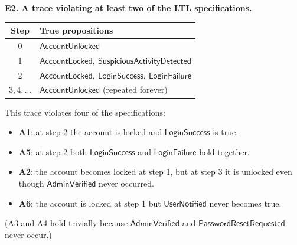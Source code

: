 \documentclass[a4paper, 11pt]{article}
\newcommand{\ap}[1]{\mathsf{#1}}
\newcommand{\LF}{\ap{LoginFailure}}
\newcommand{\LS}{\ap{LoginSuccess}}
\newcommand{\AL}{\ap{AccountLocked}}
\newcommand{\AU}{\ap{AccountUnlocked}}
\newcommand{\AV}{\ap{AdminVerified}}
\newcommand{\PR}{\ap{PasswordResetRequested}}
\newcommand{\UN}{\ap{UserNotified}}
\newcommand{\SA}{\ap{SuspiciousActivityDetected}}
\begin{document}
\begin{solution}
\medskip
{}
\noindent\textbf{E2. A trace violating at least two of the LTL specifications.}
\begin{center}
\begin{tabular}{c|l}
\hline
Step & True propositions \\
\hline
0 & $\AU$ \\
1 & $\AL,\ \SA$ \\
2 & $\AL,\ \LS,\ \LF$ \\
$3,4,\dots$ & $\AU$ (repeated forever) \\
\hline
\end{tabular}
\end{center}
This trace violates four of the specifications:
\begin{itemize}
    \item \textbf{A1}: at step 2 the account is locked and $\LS$ is true.
    \item \textbf{A5}: at step 2 both $\LS$ and $\LF$ hold together.
    \item \textbf{A2}: the account becomes locked at step 1, but at step 3 it is unlocked even though $\AV$ never occurred.
    \item \textbf{A6}: the account is locked at step 1 but $\UN$ never becomes true.
\end{itemize}
(A3 and A4 hold trivially because $\AV$ and $\PR$ never occur.)


\end{solution}
\end{document}

